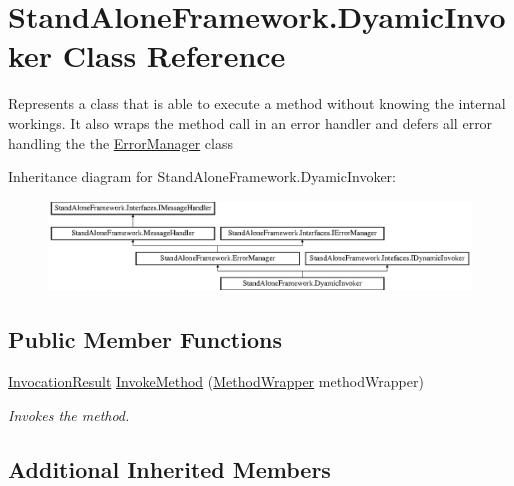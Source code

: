 \hypertarget{class_stand_alone_framework_1_1_dyamic_invoker}{\section{Stand\+Alone\+Framework.\+Dyamic\+Invoker Class Reference}
\label{class_stand_alone_framework_1_1_dyamic_invoker}
}


Represents a class that is able to execute a method without knowing the internal workings. It also wraps the method call in an error handler and defers all error handling the the {\ttfamily \hyperlink{class_stand_alone_framework_1_1_error_manager}{Error\+Manager} class}  


Inheritance diagram for Stand\+Alone\+Framework.\+Dyamic\+Invoker\+:\begin{figure}[H]
\begin{center}
\leavevmode
\includegraphics[height=2.400857cm]{class_stand_alone_framework_1_1_dyamic_invoker}
\end{center}
\end{figure}
\subsection*{Public Member Functions}
\begin{DoxyCompactItemize}
\item 
\hyperlink{class_stand_alone_framework_1_1_framework_classes_1_1_invocation_result}{Invocation\+Result} \hyperlink{class_stand_alone_framework_1_1_dyamic_invoker_afa62776cb39ce4e31221dc1373440d06}{Invoke\+Method} (\hyperlink{class_stand_alone_framework_1_1_factories_1_1_method_factory_1_1_method_wrapper}{Method\+Wrapper} method\+Wrapper)
\begin{DoxyCompactList}\small\item\em Invokes the method. \end{DoxyCompactList}\end{DoxyCompactItemize}
\subsection*{Additional Inherited Members}


